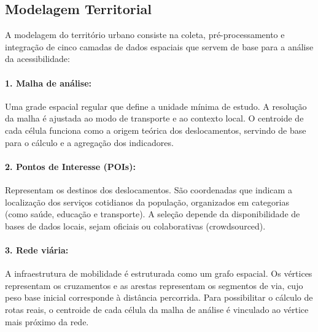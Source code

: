 
\subsection{Modelagem Territorial}
\label{subsec:territorial_modelling}

A modelagem do território urbano consiste na coleta, pré-processamento e integração de cinco camadas de dados espaciais que servem de base para a análise da acessibilidade:

\paragraph{1. Malha de análise:} Uma grade espacial regular que define a unidade mínima de estudo. A resolução da malha é ajustada ao modo de transporte e ao contexto local. O centroide de cada célula funciona como a origem teórica dos deslocamentos, servindo de base para o cálculo e a agregação dos indicadores.

\paragraph{2. Pontos de Interesse (POIs):} Representam os destinos dos deslocamentos. São coordenadas que indicam a localização dos serviços cotidianos da população, organizados em categorias (como saúde, educação e transporte). A seleção depende da disponibilidade de bases de dados locais, sejam oficiais ou colaborativas (crowdsourced).

\paragraph{3. Rede viária:} A infraestrutura de mobilidade é estruturada como um grafo espacial. Os vértices representam os cruzamentos e as arestas representam os segmentos de via, cujo peso base inicial corresponde à distância percorrida. Para possibilitar o cálculo de rotas reais, o centroide de cada célula da malha de análise é vinculado ao vértice mais próximo da rede.

